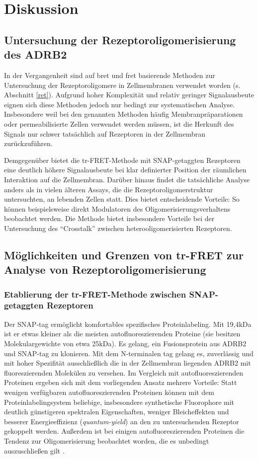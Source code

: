 \chapter{Diskussion}\label{chapter:diskussion}

\section{Untersuchung der Rezeptoroligomerisierung des ADRB2}
In der Vergangenheit sind auf \gls{bret} und \gls{fret} basierende Methoden zur Untersuchung der Rezeptoroligomere in Zellmembranen verwendet worden (s. Abschnitt \ref{ret}). Aufgrund hoher Komplexität und relativ geringer Signalausbeute eignen sich diese Methoden jedoch nur bedingt zur systematischen Analyse. Insbesondere weil bei den genannten Methoden häufig Membranpräparationen oder permeabilisierte Zellen verwendet werden müssen, ist die Herkunft des Signals nur schwer tatsächlich auf Rezeptoren in der Zellmembran zurückzuführen.

Demgegenüber bietet die tr-FRET-Methode mit SNAP-getaggten Rezeptoren eine deutlich höhere Signalausbeute bei klar definierter Position der räumlichen Interaktion auf die Zellmembran. Darüber hinaus findet die tatsächliche Analyse anders als in vielen älteren Assays, die die Rezeptoroligomerstruktur untersuchten, an lebenden Zellen statt. Dies bietet entscheidende Vorteile: So können beispielsweise direkt Modulatoren des Oligomerisierungsverhaltens beobachtet werden. Die Methode bietet insbesondere Vorteile bei der Untersuchung des "`Crosstalk"' zwischen heterooligomerisierten Rezeptoren. 

\section{Möglichkeiten und Grenzen von tr-FRET zur Analyse von Rezeptoroligomerisierung}
\label{discussion:limits}

\subsection{Etablierung der tr-FRET-Methode zwischen SNAP-getaggten Rezeptoren}
Der SNAP-tag ermöglicht komfortables spezifisches Proteinlabeling. Mit 19,4\si{\kilo Da} ist er etwas kleiner als die meisten autofluoreszierenden Proteine (sie besitzen Molekulargewichte von etwa 25\si{\kilo Da}). Es gelang, ein Fusionsprotein aus ADRB2 und SNAP-tag zu klonieren. Mit dem N-terminalen tag gelang es, zuverlässig und mit hoher Spezifität ausschließlich die in der Zellmembran liegenden ADRB2 mit fluoreszierenden Molekülen zu versehen. Im Vergleich mit autofluoreszierenden Proteinen ergeben sich mit dem vorliegenden Ansatz mehrere Vorteile: Statt wenigen verfügbaren autofluoreszierenden Proteinen können mit dem Proteinlabelingsystem beliebige, insbesondere synthetische Fluorophore mit deutlich günstigeren spektralen Eigenschaften, weniger Bleicheffekten und besserer Energieeffizienz (\textit{quantum-yield}) an den zu untersuchenden Rezeptor gekoppelt werden. Außerdem ist bei einigen autofluoreszierenden Proteinen die Tendenz zur Oligomerisierung beobachtet worden, die es unbedingt auszuschließen gilt \parencite{Zhang2002a, Keppler2004}.

